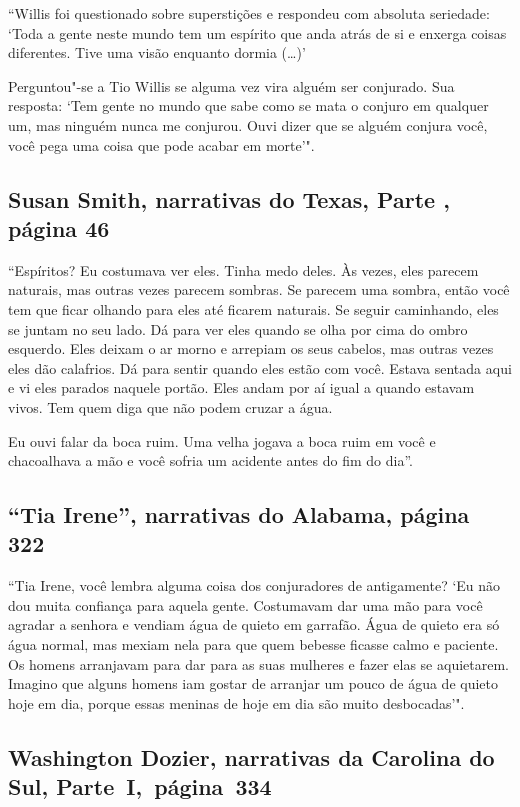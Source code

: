``Willis foi questionado sobre superstições e respondeu com absoluta
seriedade: `Toda a gente neste mundo tem um espírito que anda atrás de
si e enxerga coisas diferentes. Tive uma visão enquanto dormia
(\ldots{})'

Perguntou"-se a Tio Willis se alguma vez vira alguém ser conjurado. Sua
resposta: `Tem gente no mundo que sabe como se mata o conjuro em
qualquer um, mas ninguém nunca me conjurou. Ouvi dizer que se alguém
conjura você, você pega uma coisa que pode acabar em morte'".

\subsection{Susan Smith, narrativas do Texas, Parte , página 46}
\label{ref248} 

``Espíritos? Eu costumava ver eles. Tinha medo deles. Às vezes, eles
parecem naturais, mas outras vezes parecem sombras. Se parecem uma
sombra, então você tem que ficar olhando para eles até ficarem naturais.
Se seguir caminhando, eles se juntam no seu lado. Dá para ver eles
quando se olha por cima do ombro esquerdo. Eles deixam o ar morno e
arrepiam os seus cabelos, mas outras vezes eles dão calafrios. Dá para
sentir quando eles estão com você. Estava sentada aqui e vi eles parados
naquele portão. Eles andam por aí igual a quando estavam vivos. Tem quem
diga que não podem cruzar a água.

Eu ouvi falar da boca ruim. Uma velha jogava a boca ruim em você e
chacoalhava a mão e você sofria um acidente antes do fim do dia''.

\subsection{``Tia Irene'', narrativas do Alabama, página 322}

``Tia Irene, você lembra alguma coisa dos conjuradores de antigamente?
`Eu não dou muita confiança para aquela gente. Costumavam dar uma mão
para você agradar a senhora e vendiam água de quieto em garrafão. Água
de quieto era só água normal, mas mexiam nela para que quem bebesse
ficasse calmo e paciente. Os homens arranjavam para dar para as suas
mulheres e fazer elas se aquietarem. Imagino que alguns homens iam
gostar de arranjar um pouco de água de quieto hoje em dia, porque essas
meninas de hoje em dia são muito desbocadas'".

\subsection{Washington Dozier, narrativas da Carolina do Sul, Parte~I,~página~334} \label{ref76}

